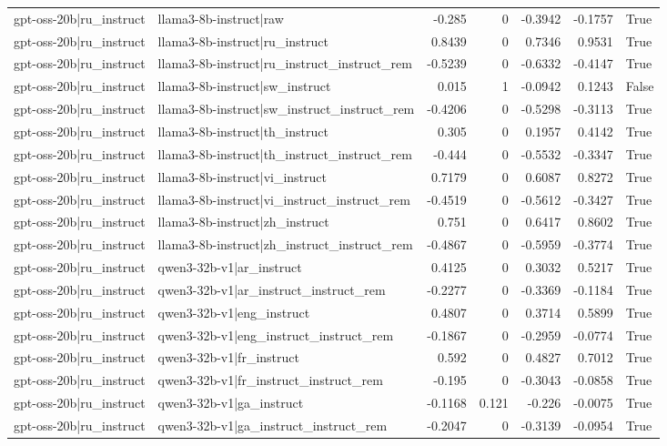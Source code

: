\begin{table}
\begin{tabular}{l l r r r r l}
gpt-oss-20b|ru_instruct & llama3-8b-instruct|raw & -0.285 & 0 & -0.3942 & -0.1757 & True \\
gpt-oss-20b|ru_instruct & llama3-8b-instruct|ru_instruct & 0.8439 & 0 & 0.7346 & 0.9531 & True \\
gpt-oss-20b|ru_instruct & llama3-8b-instruct|ru_instruct_instruct_rem & -0.5239 & 0 & -0.6332 & -0.4147 & True \\
gpt-oss-20b|ru_instruct & llama3-8b-instruct|sw_instruct & 0.015 & 1 & -0.0942 & 0.1243 & False \\
gpt-oss-20b|ru_instruct & llama3-8b-instruct|sw_instruct_instruct_rem & -0.4206 & 0 & -0.5298 & -0.3113 & True \\
gpt-oss-20b|ru_instruct & llama3-8b-instruct|th_instruct & 0.305 & 0 & 0.1957 & 0.4142 & True \\
gpt-oss-20b|ru_instruct & llama3-8b-instruct|th_instruct_instruct_rem & -0.444 & 0 & -0.5532 & -0.3347 & True \\
gpt-oss-20b|ru_instruct & llama3-8b-instruct|vi_instruct & 0.7179 & 0 & 0.6087 & 0.8272 & True \\
gpt-oss-20b|ru_instruct & llama3-8b-instruct|vi_instruct_instruct_rem & -0.4519 & 0 & -0.5612 & -0.3427 & True \\
gpt-oss-20b|ru_instruct & llama3-8b-instruct|zh_instruct & 0.751 & 0 & 0.6417 & 0.8602 & True \\
gpt-oss-20b|ru_instruct & llama3-8b-instruct|zh_instruct_instruct_rem & -0.4867 & 0 & -0.5959 & -0.3774 & True \\
gpt-oss-20b|ru_instruct & qwen3-32b-v1|ar_instruct & 0.4125 & 0 & 0.3032 & 0.5217 & True \\
gpt-oss-20b|ru_instruct & qwen3-32b-v1|ar_instruct_instruct_rem & -0.2277 & 0 & -0.3369 & -0.1184 & True \\
gpt-oss-20b|ru_instruct & qwen3-32b-v1|eng_instruct & 0.4807 & 0 & 0.3714 & 0.5899 & True \\
gpt-oss-20b|ru_instruct & qwen3-32b-v1|eng_instruct_instruct_rem & -0.1867 & 0 & -0.2959 & -0.0774 & True \\
gpt-oss-20b|ru_instruct & qwen3-32b-v1|fr_instruct & 0.592 & 0 & 0.4827 & 0.7012 & True \\
gpt-oss-20b|ru_instruct & qwen3-32b-v1|fr_instruct_instruct_rem & -0.195 & 0 & -0.3043 & -0.0858 & True \\
gpt-oss-20b|ru_instruct & qwen3-32b-v1|ga_instruct & -0.1168 & 0.121 & -0.226 & -0.0075 & True \\
gpt-oss-20b|ru_instruct & qwen3-32b-v1|ga_instruct_instruct_rem & -0.2047 & 0 & -0.3139 & -0.0954 & True \\

\end{tabular}
\end{table}

